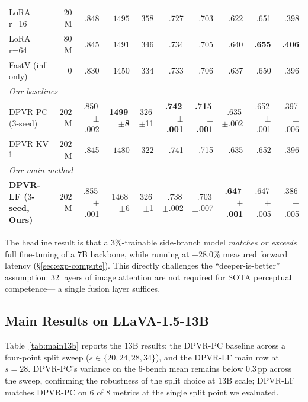 \documentclass[a4paper,fleqn,review]{cas-sc}
\newcommand{\dpvrlf}{DPVR-LF}
\newcommand{\dpvrpc}{DPVR-PC}
\newcommand{\dpvrkv}{DPVR-KV}
\begin{document}
\begin{table}[t]
{\begin{tabular}{lrrrrrrrrr}
LoRA r=16            & $20$M  & .848 & $1495$ & \textbf{$358$} & .727 & .703 & .622 & .651 & .398 \\
LoRA r=64            & $80$M  & .845 & $1491$ & $346$ & .734 & .705 & .640 & \textbf{.655} & \textbf{.406} \\
FastV (inf-only)     & $0$    & .830 & $1450$ & $334$ & .733 & .706 & .637 & .650 & .396 \\
\midrule
\multicolumn{10}{l}{\emph{Our baselines}} \\
\dpvrpc{} ($3$-seed)  & $202$M & .850\,$\pm$.002 & \textbf{1499\,$\pm$8} & 326\,$\pm$11 & \textbf{.742\,$\pm$.001} & \textbf{.715\,$\pm$.001} & .635\,$\pm$.002 & .652\,$\pm$.001 & .397\,$\pm$.006 \\
\dpvrkv{}$^{\ddagger}$ & $202$M & .845 & $1480$ & $322$ & .741 & .715 & .635 & .652 & .396 \\
\midrule
\multicolumn{10}{l}{\emph{Our main method}} \\
\rowcolor[RGB]{236,244,252}
\textbf{\dpvrlf{} ($3$-seed, Ours)} & $202$M & .855\,$\pm$.001 & 1468\,$\pm$6 & 326\,$\pm$1 & .738\,$\pm$.002 & .703\,$\pm$.007 & \textbf{.647\,$\pm$.001} & .647\,$\pm$.005 & .386\,$\pm$.005 \\
\bottomrule
\end{tabular}%
}
\end{table}

The headline result is that a $3\%$-trainable side-branch model
\emph{matches or exceeds} full fine-tuning of a 7B backbone, while
running at $-28.0\%$ measured forward latency (\S\ref{sec:exp-compute}). This
directly challenges the ``deeper-is-better'' assumption: $32$ layers
of image attention are not required for SOTA perceptual competence---
a single fusion layer suffices.

\subsection{Main Results on LLaVA-1.5-13B}\label{sec:exp-main13b}

Table~\ref{tab:main13b} reports the 13B results: the \dpvrpc{}
baseline across a four-point split sweep
($s \in \{20, 24, 28, 34\}$), and the \dpvrlf{} main row at $s = 28$.
\dpvrpc{}'s variance on the 6-bench mean remains below $0.3$\,pp
across the sweep, confirming the robustness of the split choice at
$13$B scale; \dpvrlf{} matches \dpvrpc{} on 6 of 8 metrics at the
single split point we evaluated.
\end{document}
